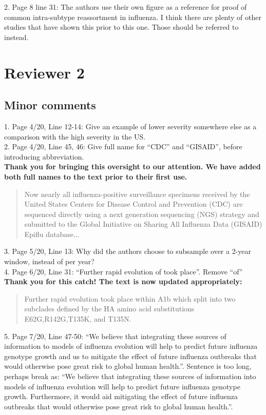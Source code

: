 \documentclass[11pt,oneside,letterpaper]{article}
\begin{document}
2. Page 8 line 31: The authors use their own figure as a reference for proof of common intra-subtype reassortment in influenza. I think there are plenty of other studies that have shown this prior to this one. Those should be referred to instead.\\

\section*{Reviewer 2}
\subsection*{Minor comments}
1. Page 4/20, Line 12-14: Give an example of lower severity somewhere else as a comparison with the high severity in the US.\\

2. Page 4/20, Line 45, 46: Give full name for “CDC” and “GISAID”, before introducing abbreviation.\\

\textbf{Thank you for bringing this oversight to our attention. We have added both full names to the text prior to their first use.}

\begin{quotation}
Now nearly all influenza-positive surveillance specimens received by the United States Centers for Disease Control and Prevention (CDC) are sequenced directly using a next generation sequencing (NGS) strategy and submitted to the Global Initiative on Sharing All Influenza Data (GISAID) Epiflu database...
\end{quotation}

3. Page 5/20, Line 13: Why did the authors choose to subsample over a 2-year window, instead of per year?\\

4. Page 6/20, Line 31: “Further rapid evolution of took place”. Remove “of”\\

\textbf{Thank you for this catch! The text is now updated appropriately:}

\begin{quotation}
  Further rapid evolution took place within A1b which split into two subclades defined by the HA amino acid substitutions E62G,R142G,T135K, and T135N.
\end{quotation}

5. Page 7/20, Line 47-50: “We believe that integrating these sources of information to models of influenza evolution will help to predict future influenza genotype growth and us to mitigate the effect of future influenza outbreaks that would otherwise pose great risk to global human health.”. Sentence is too long, perhaps break as: “We believe that integrating these sources of information into models of influenza evolution will help to predict future influenza genotype growth. Furthermore, it would aid mitigating the effect of future influenza outbreaks that would otherwise pose great risk to global human health.”.\\
\end{document}
